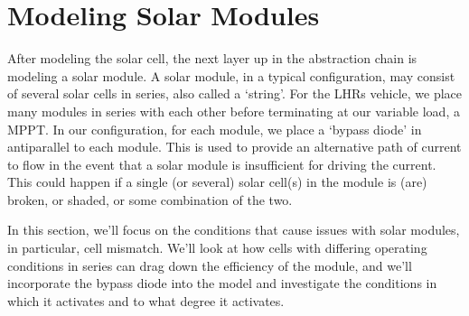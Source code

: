 \section{Modeling Solar Modules}\label{sec:modeling_solar_modules}

After modeling the solar cell, the next layer up in the abstraction chain is
modeling a solar module. A solar module, in a typical configuration, may consist
of several solar cells in series, also called a `string'. For the \ac{LHRs}
vehicle, we place many modules in series with each other before terminating at
our variable load, a \acf{MPPT}. In our configuration, for each module, we place
a `bypass diode' in antiparallel to each module. This is used to provide an
alternative path of current to flow in the event that a solar module is
insufficient for driving the current. This could happen if a single (or several)
solar cell(s) in the module is (are) broken, or shaded, or some combination of
the two.

In this section, we'll focus on the conditions that cause issues with solar
modules, in particular, cell mismatch. We'll look at how cells with differing
operating conditions in series can drag down the efficiency of the module, and
we'll incorporate the bypass diode into the model and investigate the
conditions in which it activates and to what degree it activates.


\newpage

\newpage

